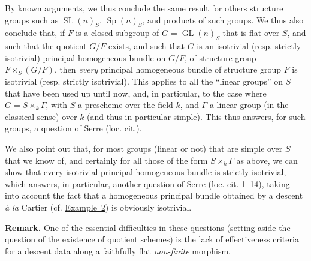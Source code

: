 \documentclass{article}
\newenvironment{rmenv}[1]
  {\phantomsection\par\medskip\noindent\textbf{#1.}\rmfamily}
  {\medskip}
\DeclareMathOperator{\GL}{GL}
\DeclareMathOperator{\SL}{SL}
\DeclareMathOperator{\Sp}{Sp}
\begin{document}
By known arguments, we thus conclude the same result for others structure groups such as $\SL(n)_S$, $\Sp(n)_S$, and products of such groups.
We thus also conclude that, if $F$ is a closed subgroup of $G=\GL(n)_S$ that is flat over $S$, and such that the quotient $G/F$ exists, and such that $G$ is an isotrivial (resp. strictly isotrivial) principal homogeneous bundle on $G/F$, of structure group $F\times_S(G/F)$, then \emph{every} principal homogeneous bundle of structure group $F$ is isotrivial (resp. strictly isotrivial).
This applies to all the ``linear groups'' on $S$ that have been used up until now, and, in particular, to the case where $G=S\times_k\Gamma$, with $S$ a prescheme over the field $k$, and $\Gamma$ a linear group (in the classical sense) over $k$ (and thus in particular simple).
This thus answers, for such groups, a question of Serre (loc. cit.).

We also point out that, for most groups (linear or not) that are simple over $S$ that we know of, and certainly for all those of the form $S\times_k\Gamma$ as above, we can show that every isotrivial principal homogeneous bundle is strictly isotrivial, which answers, in particular, another question of Serre (loc. cit. 1--14), taking into account the fact that a homogeneous principal bundle obtained by a descent \emph{\`{a} la} Cartier (cf. \hyperref[example:B.3(2)]{Example~2}) is obviously isotrivial.

\begin{rmenv}{Remark}
  One of the essential difficulties in these questions (setting aside the question of the existence of quotient schemes) is the lack of effectiveness criteria for a descent data along a faithfully flat \emph{non-finite} morphism.
\end{rmenv}




\end{document}
